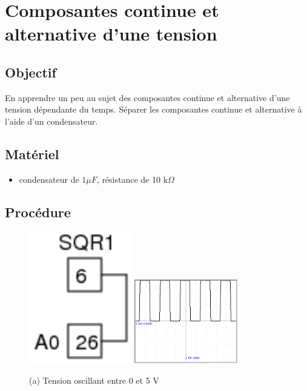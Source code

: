 \documentclass{book}
\begin{document}

\section{Composantes continue et alternative d'une tension}


  \label{sec:DC-AC}

\subsection{Objectif}


En apprendre un peu au sujet des composantes continue et alternative d'une tension dépendante du temps. Séparer les composantes continue et alternative à l'aide d'un condensateur.




\subsection{Matériel}


\begin{itemize}
  \item condensateur de $1 \mu{}F$, résistance de 10 k$\Omega$
\end{itemize}

\subsection{Procédure}


\begin{figure}[h!]
\begin{center}
\caption{\label{fig:Square-wave}(a) Tension oscillant entre 0 et 5 V }\vspace{0.5em}
\includegraphics[width=0.4\textwidth, height=0.3\textwidth, keepaspectratio]{Schematic-sqr-a0.png}
\includegraphics[width=0.4\textwidth, height=0.3\textwidth, keepaspectratio]{Pic-sqrwave2.png}
\end{center}
\end{figure}
\end{document}
